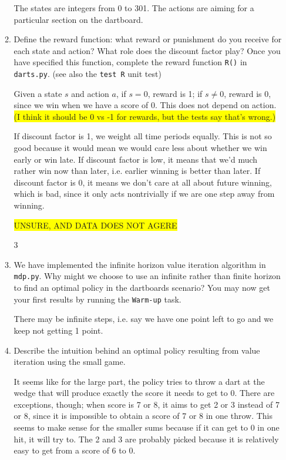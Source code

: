 \documentclass{article}
\newcommand{\edit}[1]{\colorbox{Yellow}{#1}}
\begin{document}
\begin{enumerate}
\begin{enumerate}
  The states are integers from 0 to 301. The actions are aiming for a
  particular section on the dartboard.  

  \item {Define the reward function: what reward or punishment
  do you receive for each state and action? What role does the discount
  factor play? Once you have specified this function, complete the
  reward function \texttt{R()} in \texttt{darts.py}. (see also the 
  \texttt{test R} unit test)}

  Given a state $s$ and action $a$, if $s=0$, reward is 1; if $s\neq 0$,
  reward is 0, since we win when we have a score of 0. This does not
  depend on action. 
  \edit{(I think it should be 0 vs -1 for rewards, but the tests say that's wrong.)}

  If discount factor is 1, we weight all time periods equally. This is
  not so good because it would mean we would care less about whether we
  win early or win late. 
  If discount factor is low, it means that we'd much rather win
  now than later, i.e. earlier winning is better than later. 
  If discount factor is 0, it means we don't care at all about future
  winning, which is bad, since it only acts nontrivially if we are one
  step away from winning. 

  \edit{UNSURE, AND DATA DOES NOT AGERE}

  \setcounter{enumii}3
  \item {We have implemented the infinite horizon value iteration
  algorithm in \texttt{mdp.py}. Why might we choose to use an infinite rather
  than finite horizon to find an optimal policy in the dartboards scenario? 
  You may now get your first results by running the \texttt{Warm-up} task.}

  There may be infinite steps, i.e. say we have one point left to go
  and we keep not getting 1 point. 
  
  \item {Describe the intuition behind an optimal policy resulting
  from value iteration using the small game.}

  It seems like for the large part, the policy tries to throw a dart at 
  the wedge that will produce exactly the score it needs to get to 0.
  There are exceptions, though; when score is 7 or 8, it aims to get 2 or 3
  instead of 7 or 8, since it is impossible to obtain a score of 7 or 8
  in one throw. This seems to make sense for the smaller sums because
  if it can get to 0 in one hit, it will try to. The 2 and 3 are probably
  picked because it is relatively easy to get from a score of 6
  to 0. 


\end{enumerate}
\end{enumerate}
\end{document}
